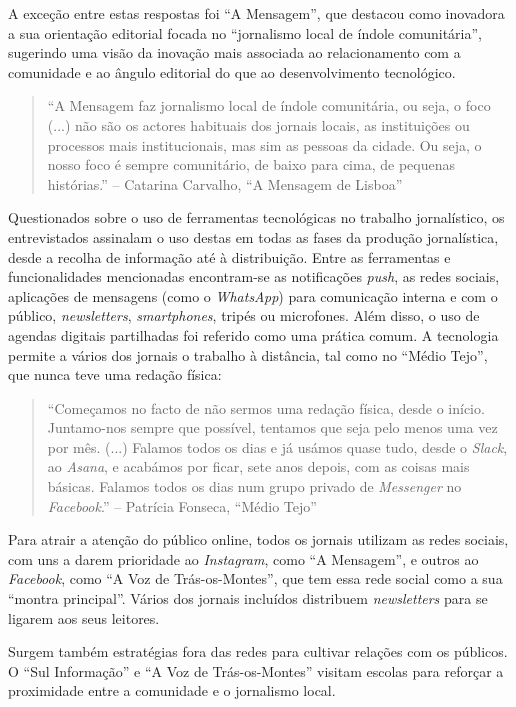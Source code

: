 \documentclass[portuguese]{textolivre}
\begin{document}
A exceção entre estas respostas foi ``A Mensagem'', que destacou como
inovadora a sua orientação editorial focada no ``jornalismo local de
índole comunitária'', sugerindo uma visão da inovação mais associada ao
relacionamento com a comunidade e ao ângulo editorial do que ao
desenvolvimento tecnológico.

\begin{quote}
``A Mensagem faz jornalismo local de índole comunitária, ou seja, o foco
(...) não são os actores habituais dos jornais locais, as instituições
ou processos mais institucionais, mas sim as pessoas da cidade. Ou seja,
o nosso foco é sempre comunitário, de baixo para cima, de pequenas
histórias.'' -- Catarina Carvalho, ``A Mensagem de Lisboa''
\end{quote}

Questionados sobre o uso de ferramentas tecnológicas no trabalho
jornalístico, os entrevistados assinalam o uso destas em todas as fases
da produção jornalística, desde a recolha de informação até à
distribuição. Entre as ferramentas e funcionalidades mencionadas
encontram-se as notificações \emph{push}, as redes sociais, aplicações
de mensagens (como o \emph{WhatsApp}) para comunicação interna e com o
público, \emph{newsletters}, \emph{smartphones}, tripés ou microfones.
Além disso, o uso de agendas digitais partilhadas foi referido como uma
prática comum. A tecnologia permite a vários dos jornais o trabalho à
distância, tal como no ``Médio Tejo'', que nunca teve uma redação
física:

\begin{quote}
``Começamos no facto de não sermos uma redação física, desde o início.
Juntamo-nos sempre que possível, tentamos que seja pelo menos uma vez
por mês. (...) Falamos todos os dias e já usámos quase tudo, desde o
\emph{Slack}, ao \emph{Asana}, e acabámos por ficar, sete anos depois,
com as coisas mais básicas. Falamos todos os dias num grupo privado de
\emph{Messenger} no \emph{Facebook}.'' -- Patrícia Fonseca, ``Médio
Tejo''
\end{quote}

Para atrair a atenção do público online, todos os jornais utilizam as
redes sociais, com uns a darem prioridade ao \emph{Instagram}, como ``A
Mensagem'', e outros ao \emph{Facebook}, como ``A Voz de
Trás-os-Montes'', que tem essa rede social como a sua ``montra
principal''. Vários dos jornais incluídos distribuem \emph{newsletters}
para se ligarem aos seus leitores.

Surgem também estratégias fora das redes para cultivar relações com os
públicos. O ``Sul Informação'' e ``A Voz de Trás-os-Montes'' visitam
escolas para reforçar a proximidade entre a comunidade e o jornalismo
local.
\end{document}
